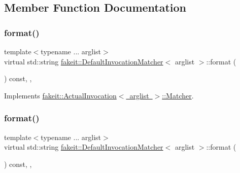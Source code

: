 \subsection{Member Function Documentation}
\mbox{\label{structfakeit_1_1DefaultInvocationMatcher_a056fc7516e51e5eb15831359cb376fef}} 
\subsubsection{\texorpdfstring{format()}{format()}\hspace{0.1cm}{\footnotesize\ttfamily [1/9]}}
{\footnotesize\ttfamily template$<$typename ... arglist$>$ \\
virtual std\+::string \mbox{\hyperlink{structfakeit_1_1DefaultInvocationMatcher}{fakeit\+::\+Default\+Invocation\+Matcher}}$<$ arglist $>$\+::format (\begin{DoxyParamCaption}{ }\end{DoxyParamCaption}) const\hspace{0.3cm}{\ttfamily [inline]}, {\ttfamily [override]}, {\ttfamily [virtual]}}



Implements \mbox{\hyperlink{structfakeit_1_1ActualInvocation_1_1Matcher_ae19e50f7b3a2cd2a9d6670acbaa47c32}{fakeit\+::\+Actual\+Invocation$<$ arglist $>$\+::\+Matcher}}.

\mbox{\label{structfakeit_1_1DefaultInvocationMatcher_a056fc7516e51e5eb15831359cb376fef}} 
\subsubsection{\texorpdfstring{format()}{format()}\hspace{0.1cm}{\footnotesize\ttfamily [2/9]}}
{\footnotesize\ttfamily template$<$typename ... arglist$>$ \\
virtual std\+::string \mbox{\hyperlink{structfakeit_1_1DefaultInvocationMatcher}{fakeit\+::\+Default\+Invocation\+Matcher}}$<$ arglist $>$\+::format (\begin{DoxyParamCaption}{ }\end{DoxyParamCaption}) const\hspace{0.3cm}{\ttfamily [inline]}, {\ttfamily [override]}, {\ttfamily [virtual]}}



